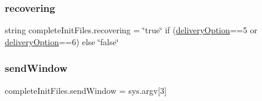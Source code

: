 \subsubsection{\texorpdfstring{recovering}{recovering}}
{\footnotesize\ttfamily string complete\+Init\+Files.\+recovering = \char`\"{}true\char`\"{} if (\hyperlink{namespacecompleteInitFiles_aac9768ead8049afb94f9fa0efd6a4e6b}{delivery\+Option}==\textquotesingle{}5\textquotesingle{} or \hyperlink{namespacecompleteInitFiles_aac9768ead8049afb94f9fa0efd6a4e6b}{delivery\+Option}==\textquotesingle{}6\textquotesingle{}) else \char`\"{}false\char`\"{}}

\mbox{\label{namespacecompleteInitFiles_a83b7c92f1a716ef8ff429ccf3516ed52}} 
\subsubsection{\texorpdfstring{send\+Window}{sendWindow}}
{\footnotesize\ttfamily complete\+Init\+Files.\+send\+Window = sys.\+argv\mbox{[}3\mbox{]}}


